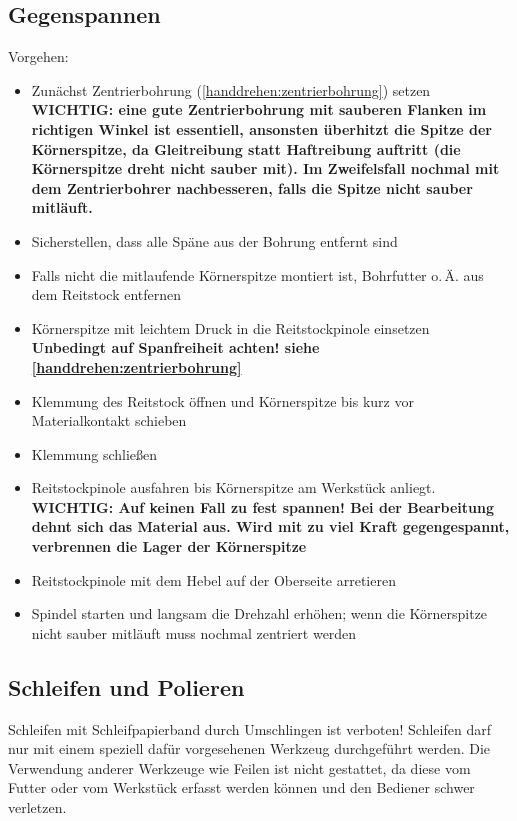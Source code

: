 \documentclass{\basedir/fablab-document}
\begin{document}
\subsection{Gegenspannen}
\label{handdrehen:gegenspannen}

Vorgehen:
\begin{itemize}
\item Zunächst Zentrierbohrung (\ref{handdrehen:zentrierbohrung}) setzen\\
	\textbf{WICHTIG: eine gute Zentrierbohrung mit sauberen Flanken im richtigen Winkel ist essentiell, ansonsten überhitzt die Spitze der Körnerspitze, da Gleitreibung statt Haftreibung auftritt (die Körnerspitze dreht nicht sauber mit). Im Zweifelsfall nochmal mit dem Zentrierbohrer nachbesseren, falls die Spitze nicht sauber mitläuft.} 
\item Sicherstellen, dass alle Späne aus der Bohrung entfernt sind
\item Falls nicht die mitlaufende Körnerspitze montiert ist, Bohrfutter o.\,Ä. aus dem Reitstock entfernen
\item Körnerspitze mit leichtem Druck in die Reitstockpinole einsetzen\\
\textbf{Unbedingt auf Spanfreiheit achten! siehe \ref{handdrehen:zentrierbohrung}}
\item Klemmung des Reitstock öffnen und Körnerspitze bis kurz vor Materialkontakt schieben 
\item Klemmung schließen
\item Reitstockpinole ausfahren bis Körnerspitze am Werkstück anliegt.\\
\textbf{WICHTIG: Auf keinen Fall zu fest spannen! Bei der Bearbeitung dehnt sich das Material aus. Wird mit zu viel Kraft gegengespannt, verbrennen die Lager der Körnerspitze}
\item Reitstockpinole mit dem Hebel auf der Oberseite arretieren
\item Spindel starten und langsam die Drehzahl erhöhen; wenn die Körnerspitze nicht sauber mitläuft muss nochmal zentriert werden
\end{itemize}

\subsection{Schleifen und Polieren}
Schleifen mit Schleifpapierband durch Umschlingen ist verboten!
Schleifen darf nur mit einem speziell dafür vorgesehenen Werkzeug durchgeführt werden. Die Verwendung anderer Werkzeuge wie Feilen ist nicht gestattet, da diese vom Futter oder vom Werkstück erfasst werden können und den Bediener schwer verletzen.
\end{document}
